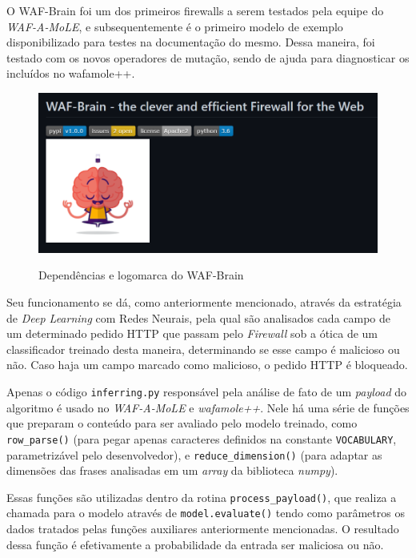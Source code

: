 O WAF-Brain \cite{waf_brain} foi um dos primeiros firewalls a serem testados pela equipe do \textit{WAF-A-MoLE}, e subsequentemente é o primeiro modelo de exemplo disponibilizado para testes na documentação do mesmo. Dessa maneira, foi testado com os novos operadores de mutação, sendo de ajuda para diagnosticar os incluídos no wafamole++.

\begin{figure}[ht]
    \centering
    \caption{Dependências e logomarca do WAF-Brain}
    \includegraphics[width=12.5cm]{figuras/WAFBrain.png} 
    \label{fig:internet} 
\end{figure}

Seu funcionamento se dá, como anteriormente mencionado, através da estratégia de \textit{Deep Learning} com Redes Neurais, pela qual são analisados cada campo de um determinado pedido HTTP que passam pelo \textit{Firewall} sob a ótica de um classificador treinado desta maneira, determinando se esse campo é malicioso ou não. Caso haja um campo marcado como malicioso, o pedido HTTP é bloqueado.

Apenas o código \verb+inferring.py+ responsável pela análise de fato de um \textit{payload} do algoritmo é usado no \textit{WAF-A-MoLE} e \textit{wafamole++}. Nele há uma série de funções que preparam o conteúdo para ser avaliado pelo modelo treinado, como \verb+row_parse()+ (para pegar apenas caracteres definidos na constante \verb+VOCABULARY+, parametrizável pelo desenvolvedor), e \verb+reduce_dimension()+ (para adaptar as dimensões das frases analisadas em um \textit{array} da biblioteca \textit{numpy}).

Essas funções são utilizadas dentro da rotina \verb+process_payload()+, que realiza a chamada para o modelo através de \verb+model.evaluate()+ tendo como parâmetros os dados tratados pelas funções auxiliares anteriormente mencionadas. O resultado dessa função é efetivamente a probabilidade da entrada ser maliciosa ou não.

